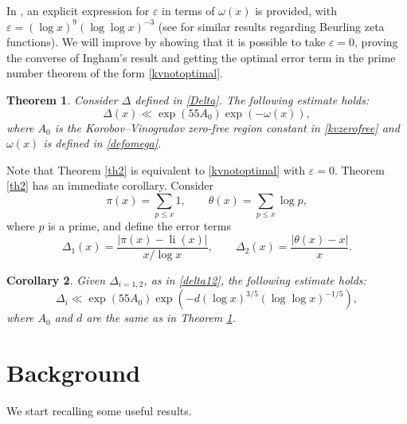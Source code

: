 \documentclass[reqno]{amsart}
\newtheorem{theorem}{Theorem}[section]
\newtheorem{corollary}[theorem]{Corollary}
\numberwithin{equation}{section}
\theoremstyle{remark}
\begin{document}
In \cite{johnston2024zerodensityestimatesoptimalityerror}, an explicit expression for $\varepsilon$ in terms of $\omega(x)$ is provided, with $\varepsilon= (\log x)^9(\log \log x)^{-3}$ (see \cite{broucke2025connectionzerofreeregionserror} for similar results regarding Beurling zeta functions). We will improve \cite{johnston2024zerodensityestimatesoptimalityerror} by showing that it is possible to take $\varepsilon=0$, proving the converse of Ingham's result and getting the optimal error term in the prime number theorem of the form \eqref{kvnotoptimal}.
\begin{theorem}\label{th3}
Consider $\Delta$ defined in \eqref{Delta}. The following estimate holds:
    \begin{equation*}
        \Delta(x)\ll \exp(55A_0)\exp(-\omega(x)),
    \end{equation*}
    where $A_0$ is the Korobov--Vinogradov zero-free region constant in \eqref{kvzerofree} and $\omega(x)$ is defined in \eqref{defomega}.
\end{theorem}
Note that Theorem \ref{th2} is equivalent to  \eqref{kvnotoptimal} with $\varepsilon=0$. Theorem \ref{th2} has an immediate corollary. Consider
$$
\pi(x)=\sum_{p \leq x} 1, \qquad \theta(x)=\sum_{p \leq x} \log p,
$$
where $p$ is a prime, and define the error terms
\begin{equation}\label{delta12}
    \Delta_1(x)=\frac{|\pi(x)-\operatorname{li}(x)|}{x / \log x}, \qquad \Delta_2(x)=\frac{|\theta(x)-x|}{x}.
\end{equation}
\begin{corollary}
Given $\Delta_{i=1,2}$, as in \eqref{delta12}, the following estimate holds:
    \begin{equation*}
        \Delta_i\ll \exp(55A_0)\exp(-d(\log x)^{3/5}(\log\log x)^{-1/5}),
    \end{equation*}
    where $A_0$ and $d$ are the same as in Theorem \ref{th3}.
\end{corollary}
\section{Background}\label{lemmas}
We start recalling some useful results.
\end{document}
